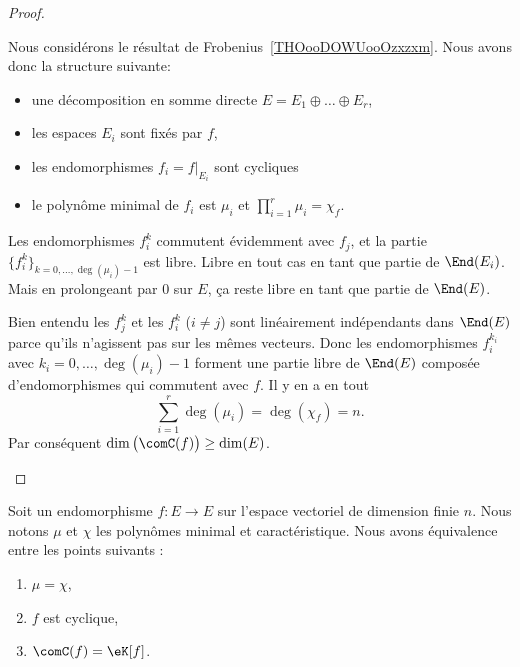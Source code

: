 \begin{proof}
\begin{subproof}
		Nous considérons le résultat de Frobenius~\ref{THOooDOWUooOzxzxm}. Nous avons donc la structure suivante:
		\begin{itemize}
			\item
			      une décomposition en somme directe \( E=E_1\oplus\ldots\oplus E_r\),
			\item
			      les espaces \( E_i\) sont fixés par \( f\),
			\item
			      les endomorphismes \( f_i=f|_{E_i}\) sont cycliques
			\item
			      le polynôme minimal de \( f_i\) est \( \mu_i\) et \( \prod_{i=1}^r\mu_i=\chi_f\).
		\end{itemize}
		Les endomorphismes \( f_i^k\) commutent évidemment avec \( f_j\), et la partie \( \{ f_i^k \}_{k=0,\ldots, \deg(\mu_i)-1}\) est libre. Libre en tout cas en tant que partie de \( \End(E_i)\). Mais en prolongeant par \( 0\) sur \( E\), ça reste libre en tant que partie de \( \End(E)\).

		Bien entendu les \( f_j^k\) et les \( f_i^k\) (\( i\neq j\)) sont linéairement indépendants dans \( \End(E)\) parce qu'ils n'agissent pas sur les mêmes vecteurs. Donc les endomorphismes \( f_i^{k_i}\) avec \( k_i=0,\ldots, \deg(\mu_i)-1\) forment une partie libre de \( \End(E)\) composée d'endomorphismes qui commutent avec \( f\). Il y en a en tout
		\begin{equation}
			\sum_{i=1}^r\deg(\mu_i)=\deg(\chi_f)=n.
		\end{equation}
		Par conséquent \( \dim\big( \comC(f) \big)\geq \dim(E)\).
	\end{subproof}
\end{proof}

\begin{theorem}      \label{THOooGLMSooYewNxW}
	Soit un endomorphisme \( f\colon E\to E\) sur l'espace vectoriel de dimension finie \( n\). Nous notons \( \mu\) et \( \chi\) les polynômes minimal et caractéristique. Nous avons équivalence entre les points suivants :
	\begin{enumerate}
		\item   \label{ITEMooLRXIooLWaYqJi}
		      \( \mu=\chi\),
		\item   \label{ITEMooLRXIooLWaYqJii}
		      \( f\) est cyclique,
		\item   \label{ITEMooLRXIooLWaYqJiii}
		      \( \comC(f)=\eK[f]\).
	\end{enumerate}
\end{theorem}

